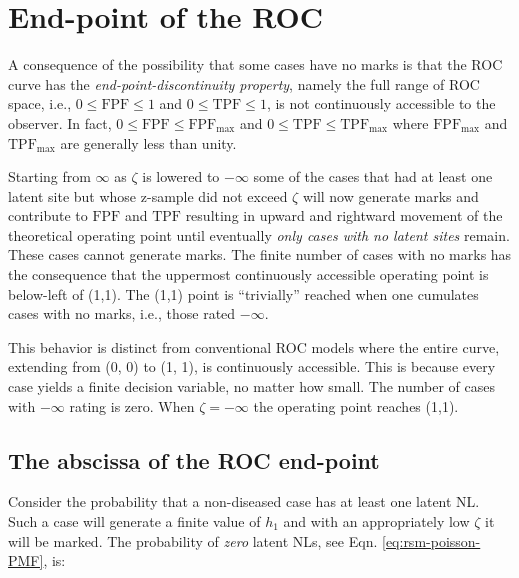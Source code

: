 \documentclass[
]{book}
\begin{document}
\hypertarget{rsm-predictions-end-point}{%
\section{End-point of the ROC}\label{rsm-predictions-end-point}}

A consequence of the possibility that some cases have no marks is that the ROC curve has the \emph{end-point-discontinuity property}, namely the full range of ROC space, i.e., \(0 \leq \text{FPF} \leq 1\) and \(0 \leq \text{TPF} \leq 1\), is not continuously accessible to the observer. In fact, \(0 \leq \text{FPF} \leq \text{FPF}_{\text{max}}\) and \(0 \leq \text{TPF} \leq \text{TPF}_{\text{max}}\) where \(\text{FPF}_{\text{max}}\) and \(\text{TPF}_{\text{max}}\) are generally less than unity.

Starting from \(\infty\) as \(\zeta\) is lowered to \(-\infty\) some of the cases that had at least one latent site but whose z-sample did not exceed \(\zeta\) will now generate marks and contribute to \(\text{FPF}\) and \(\text{TPF}\) resulting in upward and rightward movement of the theoretical operating point until eventually \emph{only cases with no latent sites} remain. These cases cannot generate marks. The finite number of cases with no marks has the consequence that the uppermost continuously accessible operating point is below-left of (1,1). The (1,1) point is ``trivially'' reached when one cumulates cases with no marks, i.e., those rated \(-\infty\).

This behavior is distinct from conventional ROC models where the entire curve, extending from (0, 0) to (1, 1), is continuously accessible. This is because every case yields a finite decision variable, no matter how small. The number of cases with \(-\infty\) rating is zero. When \(\zeta = -\infty\) the operating point reaches (1,1).

\hypertarget{rsm-predictions-constrained-end-point-abscissa}{%
\subsection{The abscissa of the ROC end-point}\label{rsm-predictions-constrained-end-point-abscissa}}

Consider the probability that a non-diseased case has at least one latent NL. Such a case will generate a finite value of \(h_1\) and with an appropriately low \(\zeta\) it will be marked. The probability of \emph{zero} latent NLs, see Eqn. \eqref{eq:rsm-poisson-PMF}, is:
\end{document}
